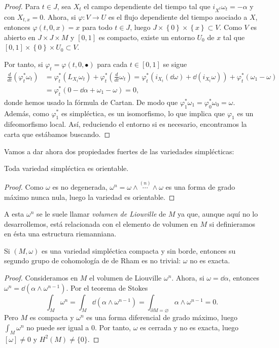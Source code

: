 \begin{proof}
  Para $t \in J$, sea $X_t$ el campo dependiente del tiempo tal que $i_{X^t}\omega_t= - \alpha$ y con $X_{t,x}=0$. Ahora, si $\varphi:V\rightarrow U$ es el flujo dependiente del tiempo asociado a $X$, entonces $\varphi(t,0,x)=x$ para todo $t\in J$, luego $J\times \left\{ 0 \right\}\times \left\{ x \right\} \subset V$. Como $V$ es abierto en $J\times J\times M$ y $[0,1]$ es compacto, existe un entorno $U_0$ de $x$  tal que $[0,1]\times \left\{ 0 \right\}\times U_0 \subset V$. 
  
  Por tanto, si $\varphi_t = \varphi(t,0,\bullet)$ para cada $t\in [0,1]$ se sigue
  \begin{align*}
    \frac{d}{dt}(\varphi_t^*\omega_t) & = \varphi_t^* (L_{X_t}\omega_t) + \varphi_t^* \left( \frac{d}{dt}\omega_t \right) = \varphi_t^* (i_{X_t}(\dd \omega)+\dd (i_{X_t}\omega))+\varphi_t^*(\omega_1-\omega) \\
    & = \varphi_t^*(0-\dd \alpha + \omega_1 - \omega) = 0,
  \end{align*}
  donde hemos usado la fórmula de Cartan. De modo que $\varphi_1^*\omega_1=\varphi_0^*\omega_0=\omega$. Además, como $\varphi_1^*$ es simpléctica, es un isomorfismo, lo que implica que $\varphi_1$ es un difeomorfismo local. Así, reduciendo el entorno si es necesario, encontramos la carta que estábamos buscando.
\end{proof}

Vamos a dar ahora dos propiedades fuertes de las variedades simplécticas:
\begin{prop}
  Toda variedad simpléctica es orientable.
\end{prop}
\begin{proof}
  Como $\omega$ es no degenerada, $\omega^n=\omega \wedge \overset{(n)}{\cdots} \wedge \omega$ es una forma de grado máximo nunca nula, luego la variedad es orientable.
\end{proof}

A esta $\omega^n$ se le suele llamar \emph{volumen de Liouville} de $M$ ya que, aunque aquí no lo desarrollemos, está relacionada con el elemento de volumen en $M$ si definieramos en ésta una estructura riemanniana.

\begin{prop}
  Si $(M,\omega)$ es una variedad simpléctica compacta y sin borde, entonces su segundo grupo de cohomología de de Rham es no trivial: $\omega$ no es exacta.
\end{prop}
\begin{proof}
  Consideramos en $M$ el volumen de Liouville $\omega^n$. Ahora, si $\omega=\dd \alpha$, entonces $\omega^n=\dd (\alpha \wedge \omega^{n-1})$. Por el teorema de Stokes
  \begin{equation*}
    \int_M \omega^n=\int_M \dd (\alpha \wedge \omega^{n-1}) = \int_{\partial M=\varnothing} \alpha \wedge \omega^{n-1}=0.
  \end{equation*}
  Pero $M$ es compacta y $\omega^n$ es una forma diferencial de grado máximo, luego $\int_M \omega^n$ no puede ser igual a $0$. Por tanto, $\omega$ es cerrada y no es exacta, luego $[\omega]\neq 0$ y $H^2(M) \neq \{0\}$.
\end{proof}

